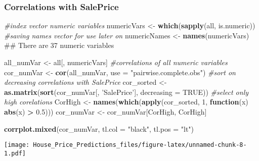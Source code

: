 \documentclass[]{article}
\newenvironment{Shaded}{\begin{snugshade}}{\end{snugshade}}
\newcommand{\KeywordTok}[1]{\textcolor[rgb]{0.13,0.29,0.53}{\textbf{#1}}}
\newcommand{\DataTypeTok}[1]{\textcolor[rgb]{0.13,0.29,0.53}{#1}}
\newcommand{\DecValTok}[1]{\textcolor[rgb]{0.00,0.00,0.81}{#1}}
\newcommand{\FloatTok}[1]{\textcolor[rgb]{0.00,0.00,0.81}{#1}}
\newcommand{\StringTok}[1]{\textcolor[rgb]{0.31,0.60,0.02}{#1}}
\newcommand{\CommentTok}[1]{\textcolor[rgb]{0.56,0.35,0.01}{\textit{#1}}}
\newcommand{\OtherTok}[1]{\textcolor[rgb]{0.56,0.35,0.01}{#1}}
\newcommand{\ControlFlowTok}[1]{\textcolor[rgb]{0.13,0.29,0.53}{\textbf{#1}}}
\newcommand{\OperatorTok}[1]{\textcolor[rgb]{0.81,0.36,0.00}{\textbf{#1}}}
\newcommand{\NormalTok}[1]{#1}
\begin{document}
\subsubsection{Correlations with
SalePrice}\label{correlations-with-saleprice}

\begin{Shaded}
\begin{Highlighting}[]
\CommentTok{#index vector numeric variables}
\NormalTok{numericVars <-}\StringTok{ }\KeywordTok{which}\NormalTok{(}\KeywordTok{sapply}\NormalTok{(all, is.numeric))}
\CommentTok{#saving names vector for use later on}
\NormalTok{numericNames <-}\StringTok{ }\KeywordTok{names}\NormalTok{(numericVars)}
\NormalTok{## There are 37 numeric variables}
\end{Highlighting}
\end{Shaded}

\begin{Shaded}
\begin{Highlighting}[]
\NormalTok{all_numVar <-}\StringTok{ }\NormalTok{all[, numericVars]}
\CommentTok{#correlations of all numeric variables}
\NormalTok{cor_numVar <-}\StringTok{ }\KeywordTok{cor}\NormalTok{(all_numVar, }\DataTypeTok{use =} \StringTok{"pairwise.complete.obs"}\NormalTok{)}
\CommentTok{#sort on decreasing correlations with SalePrice}
\NormalTok{cor_sorted <-}\StringTok{ }\KeywordTok{as.matrix}\NormalTok{(}\KeywordTok{sort}\NormalTok{(cor_numVar[, }\StringTok{'SalePrice'}\NormalTok{], }\DataTypeTok{decreasing =} \OtherTok{TRUE}\NormalTok{))}
\CommentTok{#select only high corelations}
\NormalTok{CorHigh <-}\StringTok{ }\KeywordTok{names}\NormalTok{(}\KeywordTok{which}\NormalTok{(}\KeywordTok{apply}\NormalTok{(cor_sorted, }\DecValTok{1}\NormalTok{, }\ControlFlowTok{function}\NormalTok{(x) }\KeywordTok{abs}\NormalTok{(x) }\OperatorTok{>}\StringTok{ }\FloatTok{0.5}\NormalTok{)))}
\NormalTok{cor_numVar <-}\StringTok{ }\NormalTok{cor_numVar[CorHigh, CorHigh]}

\KeywordTok{corrplot.mixed}\NormalTok{(cor_numVar, }\DataTypeTok{tl.col =} \StringTok{"black"}\NormalTok{, }\DataTypeTok{tl.pos =} \StringTok{"lt"}\NormalTok{)}
\end{Highlighting}
\end{Shaded}

\texttt{[image: House\_Price\_Predictions\_files/figure-latex/unnamed-chunk-8-1.pdf]}
\end{document}
